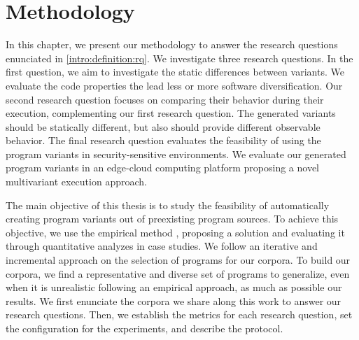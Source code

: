 \chapter{Methodology} 
\label{chapter:method}

\pagestyle{plain}
\renewcommand{\tool}{CROW\xspace}


In this chapter, we present our methodology to answer the research questions enunciated in \autoref{intro:definition:rq}.
We investigate three research questions. In the first question, we aim to investigate the static differences between variants. We evaluate the code properties the lead less or more software diversification.
Our second research question focuses on comparing their behavior during their execution, complementing our first research question. The generated variants should be statically different, but also should provide different observable behavior. 
The final research question evaluates the feasibility of using the program variants in security-sensitive environments. We evaluate our generated program variants in an edge-cloud computing platform proposing a novel multivariant execution approach.

The main objective of this thesis is to study the feasibility of automatically creating program variants out of preexisting program sources. To achieve this objective,
we use the empirical method \cite{Runeson2020}, proposing a solution and evaluating it through quantitative analyzes in case studies. We follow an iterative and incremental approach on the selection of programs for our corpora. To build our corpora, we find a representative and diverse set of programs to generalize, even when it is unrealistic following an empirical approach, as much as possible our results.
We first enunciate the corpora we share along this work to answer our research questions. Then, we establish the metrics for each research question, set the configuration for the experiments, and describe the protocol.

